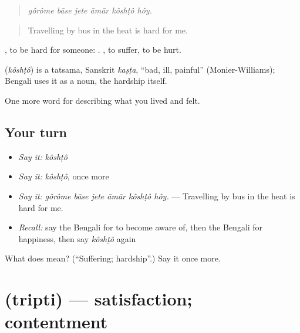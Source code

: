 \begin{quote}
     
\end{quote}

\begin{quote}
\emph{gôrôme bāse jete āmār kôshṭô hôy.}
\end{quote}

\begin{quote}
Travelling by bus in the heat is hard for me.
\end{quote}

 , to be hard for someone:   .  , to suffer, to be hurt.

\begin{cousinweb}
\textbf{} (\emph{kôshṭô}) is a tatsama, Sanskrit \emph{kaṣṭa}, \textquotedblleft{}bad, ill, painful\textquotedblright{} (Monier-Williams); Bengali uses it as a noun, the hardship itself.
\end{cousinweb}

\begin{grammarlens}[title={What you've built}]
One more word for describing what you lived and felt.
\end{grammarlens}

\subsection*{Your turn}
\begin{itemize}
\raggedright
  \item \emph{Say it:} \emph{kôshṭô}
  \item \emph{Say it:} \emph{kôshṭô}, once more
  \item \emph{Say it:} \emph{gôrôme bāse jete āmār kôshṭô hôy.} — Travelling by bus in the heat is hard for me.
  \item \emph{Recall:} say the Bengali for to become aware of, then the Bengali for happiness, then say \emph{kôshṭô} again
\end{itemize}

\begin{tcolorbox}[breakable,colback=teal!4,colframe=teal!35!black,title={Before you move on}]
What does  mean? (\textquotedblleft{}Suffering; hardship\textquotedblright{}.) Say it once more.
\end{tcolorbox}
\section[\texorpdfstring{\bn{তৃপ্তি} (tripti)}{তৃপ্তি (tripti)}]{ (tripti) — satisfaction; contentment}

